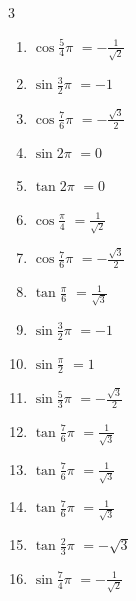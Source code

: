 \begin{multicols}{3}
\begin{enumerate}
  \item $\displaystyle \cos{\frac{5}{4}\pi}$
        $\displaystyle =-\frac{1}{\sqrt{2}}$

  \item $\displaystyle \sin{\frac{3}{2}\pi}$
        $\displaystyle =-1$

  \item $\displaystyle \cos{\frac{7}{6}\pi}$
        $\displaystyle =-\frac{\sqrt{3}}{2}$

  \item $\displaystyle \sin{2\pi}$
        $\displaystyle =0$

  \item $\displaystyle \tan{2\pi}$
        $\displaystyle =0$

  \item $\displaystyle \cos{\frac{\pi}{4}}$
        $\displaystyle =\frac{1}{\sqrt{2}}$

  \item $\displaystyle \cos{\frac{7}{6}\pi}$
        $\displaystyle =-\frac{\sqrt{3}}{2}$

  \item $\displaystyle \tan{\frac{\pi}{6}}$
        $\displaystyle =\frac{1}{\sqrt{3}}$

  \item $\displaystyle \sin{\frac{3}{2}\pi}$
        $\displaystyle =-1$

\columnbreak %

\resetques

  \item $\displaystyle \sin{\frac{\pi}{2}}$
        $\displaystyle =1$

  \item $\displaystyle \sin{\frac{5}{3}\pi}$
        $\displaystyle =-\frac{\sqrt{3}}{2}$

  \item $\displaystyle \tan{\frac{7}{6}\pi}$
        $\displaystyle =\frac{1}{\sqrt{3}}$

  \item $\displaystyle \tan{\frac{7}{6}\pi}$
        $\displaystyle =\frac{1}{\sqrt{3}}$

  \item $\displaystyle \tan{\frac{7}{6}\pi}$
        $\displaystyle =\frac{1}{\sqrt{3}}$

  \item $\displaystyle \tan{\frac{2}{3}\pi}$
        $\displaystyle =-\sqrt{3}$

  \item $\displaystyle \sin{\frac{7}{4}\pi}$
        $\displaystyle =-\frac{1}{\sqrt{2}}$


\end{enumerate}
\end{multicols}
